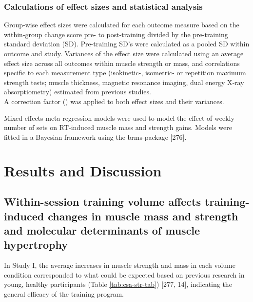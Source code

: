 \documentclass[twoside,10pt]{gihclass} %
\begin{document}
\hypertarget{calculations-of-effect-sizes-and-statistical-analysis}{%
\subsection{Calculations of effect sizes and statistical analysis}\label{calculations-of-effect-sizes-and-statistical-analysis}}

Group-wise effect sizes were calculated for each outcome measure based
on the within-group change score pre- to post-training divided by the
pre-training standard deviation (SD). Pre-training SD's were calculated
as a pooled SD within outcome and study. Variances of the effect size
were calculated using an average effect size across all outcomes within
muscle strength or mass, and correlations specific to each measurement
type (isokinetic-, isometric- or repetition maximum strength tests;
muscle thickness, magnetic resonance imaging, dual energy X‐ray
absorptiometry) estimated from previous studies.\\
A correction factor () was applied to both effect sizes and their
variances.

Mixed-effects meta-regression models were used to model the effect of
weekly number of sets on RT-induced muscle mass and strength gains.
Models were fitted in a Bayesian framework using the brms-package
{[}276{]}.

\hypertarget{results-and-discussion}{%
\chapter{Results and Discussion}\label{results-and-discussion}}

\hypertarget{within-session-training-volume-affects-training-induced-changes-in-muscle-mass-and-strength-and-molecular-determinants-of-muscle-hypertrophy}{%
\section{Within-session training volume affects training-induced changes in muscle mass and strength and molecular determinants of muscle hypertrophy}\label{within-session-training-volume-affects-training-induced-changes-in-muscle-mass-and-strength-and-molecular-determinants-of-muscle-hypertrophy}}

In Study I, the average increases in muscle strength and mass in each volume condition corresponded to what could be expected based on previous research in young, healthy participants (Table \ref{tab:csa-str-tab})
{[}277, 14{]},
indicating the general efficacy of the training program.
\end{document}
